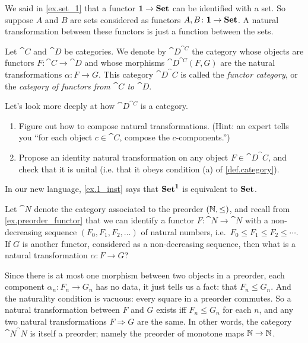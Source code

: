 \documentclass[7Sketches]{subfiles}
\begin{document}
\begin{example}%
\label{ex.1_inst}
We said in \cref{ex.set_1} that a functor $\mathbf{1}\to\mathbf{Set}$ can be identified with a set. So suppose $A$ and $B$ are sets considered as functors $A,B\colon\mathbf{1}\to\mathbf{Set}$. A natural transformation between these functors is just a function between the sets.
\end{example}

\begin{definition}%
\label{def.functor_cat}%
Let $\cat{C}$ and $\cat{D}$ be categories. We denote by $\cat{D}^{\cat{C}}$ the category whose objects are functors $F\colon\cat{C}\to\cat{D}$ and whose morphisms $\cat{D}^{\cat{C}}(F,G)$ are the natural transformations $\alpha\colon F\to G$. This category $\cat{D}^\cat{C}$ is called the \emph{functor category}, or the \emph{category of functors from $\cat{C}$ to $\cat{D}$}.
\end{definition}

\begin{exercise}%
\label{exc.exponential_cat}
Let's look more deeply at how $\cat{D}^{\cat{C}}$ is a category.
\begin{enumerate}
	\item Figure out how to compose natural transformations. (Hint: an expert tells you ``for each object $c\in\cat{C}$, compose the $c$-components.'')
	\item Propose an identity natural transformation on any object
	$F\in\cat{D}^\cat{C}$, and check that it is unital (i.e. that it obeys
	condition (a) of \cref{def.category}).%
%
	\qedhere
\end{enumerate}
\end{exercise}


\begin{example}
In our new language, \cref{ex.1_inst} says that $\mathbf{Set}^{\mathbf{1}}$ is equivalent to $\mathbf{Set}$.
\end{example}

\begin{example}
Let $\cat{N}$ denote the category associated to the preorder $(\mathbb{N},\leq)$, and recall from \cref{ex.preorder_functor} that we can identify a functor $F\colon\cat{N}\to\cat{N}$ with a non-decreasing sequence $(F_0,F_1,F_2,\ldots)$ of natural numbers, i.e.\ $F_0\leq F_1\leq F_2\leq\cdots$. If $G$ is another functor, considered as a non-decreasing sequence, then what is a natural transformation $\alpha\colon F\to G$?

Since there is at most one morphism between two objects in a preorder, each
component $\alpha_n\colon F_n\to G_n$ has no data, it just tells us a fact: that
$F_n\leq G_n$. And the naturality condition is vacuous: every square in a
preorder commutes. So a natural transformation between $F$ and $G$ exists iff
$F_n\leq G_n$ for each $n$, and any two natural transformations $F\Rightarrow G$
are the same. In other words, the category $\cat{N}^\cat{N}$ is itself a preorder; namely the preorder of monotone maps $\mathbb{N}\to\mathbb{N}$.
\end{example}%
\end{document}
